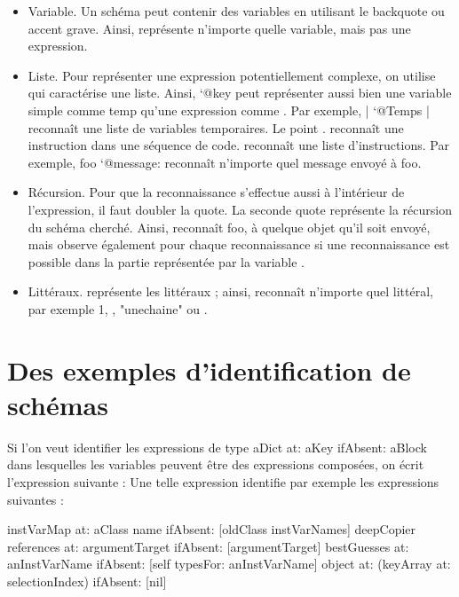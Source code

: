 \documentclass[a4paper,10pt,twoside]{book}
\begin{document}
\begin{itemize}
\item	Variable. Un sch\'ema peut contenir des variables en utilisant
  le backquote ou accent grave. Ainsi,  repr\'esente n'importe
  quelle variable, mais pas une expression.

\item Liste. Pour repr\'esenter une expression potentiellement
  complexe, on utilise  qui caract\'erise une liste. Ainsi, `@key
  peut repr\'esenter aussi bien une variable simple comme temp qu'une
  expression comme . Par exemple, | `@Temps
  | reconnaît une liste de variables temporaires. Le point . reconnaît
  une instruction dans une s\'equence de code.
  reconnaît une liste d'instructions. Par exemple, foo `@message:
   reconnaît n'importe quel message envoy\'e à foo.


\item R\'ecursion. Pour que la reconnaissance s'effectue aussi à
  l'int\'erieur de l'expression, il faut doubler la quote. La seconde
  quote repr\'esente la r\'ecursion du sch\'ema cherch\'e. Ainsi,
   reconnaît foo, à quelque objet qu'il soit envoy\'e,
  mais observe \'egalement pour chaque reconnaissance si une
  reconnaissance est possible dans la partie repr\'esent\'ee par la
  variable .

\item	Litt\'eraux. \ct{\\#} repr\'esente les litt\'eraux ; ainsi, 
  reconnaît n'importe quel litt\'eral, par exemple 1, \ct{\\#()}, "unechaine"
  ou .
\end{itemize}

\section{Des exemples d'identification de sch\'emas}

Si l'on veut identifier les expressions de type
aDict at: aKey ifAbsent: aBlock dans lesquelles les variables peuvent être des expressions compos\'ees, on \'ecrit l'expression
suivante :
Une telle expression identifie par exemple les expressions suivantes :

\begin{code}{}
instVarMap at: aClass name ifAbsent: [oldClass instVarNames]
deepCopier references at: argumentTarget ifAbsent: [argumentTarget]
bestGuesses at: anInstVarName ifAbsent: [self typesFor: anInstVarName]
object at: (keyArray at: selectionIndex) ifAbsent: [nil]
\end{code}
\end{document}
